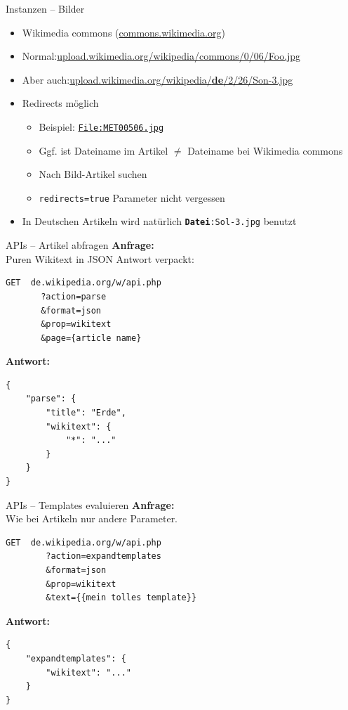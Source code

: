 \documentclass[9pt]{beamer}
\begin{document}
	\begin{frame}{Instanzen -- Bilder}
		\begin{itemize}
			\item Wikimedia commons (\href{https://commons.wikimedia.org}{commons.wikimedia.org})
			\item Normal:\newline \href{https://upload.wikimedia.org/wikipedia/commons/0/06/Foo.jpg}{upload.wikimedia.org/wikipedia/commons/0/06/Foo.jpg}
			\item Aber auch:\newline \href{https://upload.wikimedia.org/wikipedia/de/2/26/Son-3.jpg}{upload.wikimedia.org/wikipedia/\textbf{de}/2/26/Son-3.jpg}
			\pause
			
			\item Redirects möglich
			\begin{itemize}
				\item Beispiel: \href{https://commons.wikimedia.org/w/index.php?title=File:MET00506.jpg&action=edit}{\texttt{File:MET00506.jpg}}
				\item Ggf. ist Dateiname im Artikel $\neq$ Dateiname bei Wikimedia commons
				\item Nach Bild-Artikel suchen
				\item \texttt{redirects=true} Parameter nicht vergessen
			\end{itemize}
			\pause
			
			\item In Deutschen Artikeln wird natürlich \texttt{\textbf{Datei}:Sol-3.jpg} benutzt
		\end{itemize}
	\end{frame}

	\begin{frame}[fragile]{APIs -- Artikel abfragen}
		\textbf{Anfrage:}\\
		Puren Wikitext in JSON Antwort verpackt:\\
		\begin{verbatim}
GET  de.wikipedia.org/w/api.php
       ?action=parse
       &format=json
       &prop=wikitext
       &page={article name}
		\end{verbatim}\n
		\textbf{Antwort:}
		\begin{verbatim}
{
    "parse": {
        "title": "Erde",
        "wikitext": {
            "*": "..."
        }
    }
}
		\end{verbatim}
	\end{frame}

	\begin{frame}[fragile]{APIs -- Templates evaluieren}
		\textbf{Anfrage:}\\
		Wie bei Artikeln nur andere Parameter.\\
		\begin{verbatim}
GET  de.wikipedia.org/w/api.php
        ?action=expandtemplates
        &format=json
        &prop=wikitext
        &text={{mein tolles template}}
		\end{verbatim}\n
		\textbf{Antwort:}
		\begin{verbatim}
{
    "expandtemplates": {
        "wikitext": "..."
    }
}
		\end{verbatim}
	\end{frame}
\end{document}
